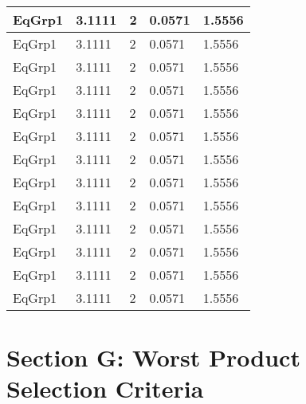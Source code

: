 \documentclass{article}
\begin{document}
\begin{longtable}[l]{|p{1.5cm} |p{3cm} |p{3cm} |p{3cm} |p{3cm} |}
            EqGrp1&3.1111&2&0.0571&1.5556\\\hline
        
            EqGrp1&3.1111&2&0.0571&1.5556\\\hline
        
            EqGrp1&3.1111&2&0.0571&1.5556\\\hline
        
            EqGrp1&3.1111&2&0.0571&1.5556\\\hline
        
            EqGrp1&3.1111&2&0.0571&1.5556\\\hline
        
            EqGrp1&3.1111&2&0.0571&1.5556\\\hline
        
            EqGrp1&3.1111&2&0.0571&1.5556\\\hline
        
            EqGrp1&3.1111&2&0.0571&1.5556\\\hline
        
            EqGrp1&3.1111&2&0.0571&1.5556\\\hline
        
            EqGrp1&3.1111&2&0.0571&1.5556\\\hline
        
            EqGrp1&3.1111&2&0.0571&1.5556\\\hline
        
            EqGrp1&3.1111&2&0.0571&1.5556\\\hline
        
            EqGrp1&3.1111&2&0.0571&1.5556\\\hline
        
        \end{longtable}
        
        
        \newpage
        \section{Section G: Worst Product Selection Criteria}
        
\end{document}
